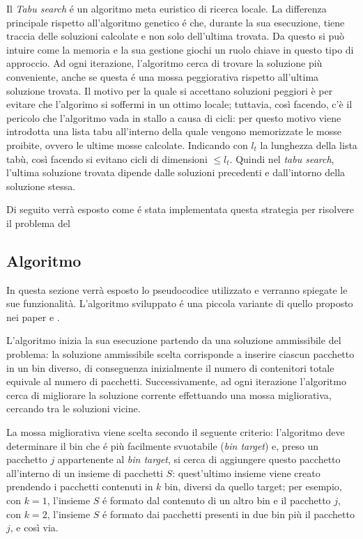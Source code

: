 Il \textit{Tabu search} é un algoritmo meta euristico di ricerca locale. La differenza principale rispetto all'algoritmo genetico é che, durante la sua esecuzione, tiene traccia delle soluzioni calcolate e non solo dell'ultima trovata. Da questo si può intuire come la memoria e la sua gestione giochi un ruolo chiave in questo tipo di approccio. Ad ogni iterazione, l'algoritmo cerca di trovare la soluzione più conveniente, anche se questa é una mossa peggiorativa rispetto all'ultima soluzione trovata. Il motivo per la quale si accettano soluzioni peggiori è per evitare che l'algorimo si soffermi in un ottimo locale; tuttavia, così facendo, c'è il pericolo che l'algoritmo vada in stallo a causa di cicli: per questo motivo viene introdotta una lista tabu all'interno della quale vengono memorizzate le mosse proibite, ovvero le ultime mosse calcolate. Indicando con $l_t$ la lunghezza della lista tabù, così facendo si evitano cicli di dimensioni $\le l_t$. Quindi nel \textit{tabu search}, l'ultima soluzione trovata dipende dalle soluzioni precedenti e dall'intorno della soluzione stessa.
   
Di seguito verrà esposto come é stata implementata questa strategia per risolvere il problema del \ddbp

\subsection{Algoritmo}
In questa sezione verrà esposto lo pseudocodice utilizzato e verranno spiegate le sue funzionalità. L'algoritmo sviluppato é una piccola variante di quello proposto nei paper \cite{lmvTabu} e \cite{lmvTspack}.

L'algoritmo inizia la sua esecuzione partendo da una soluzione ammissibile del problema: la soluzione ammissibile scelta corrisponde a inserire ciascun pacchetto in un bin diverso, di conseguenza inizialmente il numero di contenitori totale equivale al numero di pacchetti. Successivamente, ad ogni iterazione l'algoritmo cerca di migliorare la soluzione corrente effettuando una mossa migliorativa, cercando tra le soluzioni vicine.

La mossa migliorativa viene scelta secondo il seguente criterio: l'algoritmo deve determinare il bin che é più facilmente svuotabile (\textit{bin target}) e, preso un pacchetto $j$ appartenente al \textit{bin target}, si cerca di aggiungere questo pacchetto all'interno di un insieme di pacchetti $S$: quest'ultimo insieme viene creato prendendo i pacchetti contenuti in $k$ bin, diversi da quello target; per esempio, con $k=1$, l'insieme $S$ é formato dal contenuto di un altro bin e il pacchetto $j$, con $k=2$, l'insieme $S$ é formato dai pacchetti presenti in due bin più il pacchetto $j$, e così via.

